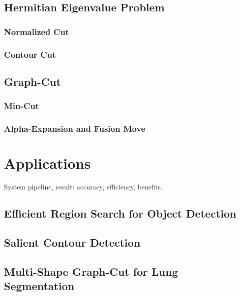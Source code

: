 \documentclass{SMBV12}
\begin{document}
\subsection{Hermitian Eigenvalue Problem}

\subsubsection{Normalized Cut}

\cite{shi2000normalized}

\subsubsection{Contour Cut}

\cite{zhu2007untangling}
\cite{KenGalShi2011}

\subsection{Graph-Cut}

\subsubsection{Min-Cut}

\subsubsection{Alpha-Expansion and Fusion Move}

\section{Applications}

System pipeline, result: accuracy, efficiency, benefits.

\subsection{Efficient Region Search for Object Detection}

\cite{VijayGrauman2011}

\subsection{Salient Contour Detection}

\cite{KenGalShi2011}

\subsection{Multi-Shape Graph-Cut for Lung Segmentation}
\end{document}

